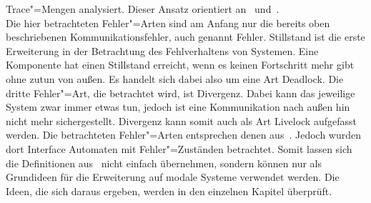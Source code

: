 Trace"=Mengen analysiert. Dieser Ansatz orientiert an~\cite{Vogler2014EIO}
und~\cite{Schinko2016BA}.\\
Die hier betrachteten Fehler"=Arten sind am Anfang nur die bereits oben
beschriebenen Kommunikationsfehler, auch genannt Fehler. Stillstand ist die
erste Erweiterung in der Betrachtung des Fehlverhaltens von Systemen. Eine
Komponente hat einen Stillstand erreicht, wenn es keinen Fortschritt mehr gibt
ohne zutun von außen. Es handelt sich dabei also um eine Art Deadlock. Die
dritte Fehler"=Art, die betrachtet wird, ist Divergenz. Dabei kann das
jeweilige System zwar immer etwas tun, jedoch ist eine Kommunikation nach außen
hin nicht mehr sichergestellt. Divergenz kann somit auch als Art Livelock
aufgefasst werden. Die betrachteten Fehler"=Arten entsprechen denen
aus~\cite{Schinko2016BA}. Jedoch wurden dort Interface Automaten mit
Fehler"=Zuständen betrachtet. Somit lassen sich die Definitionen
aus~\cite{Schinko2016BA} nicht einfach übernehmen, sondern können nur als
Grundideen für die Erweiterung auf modale Systeme verwendet werden. Die Ideen,
die sich daraus ergeben, werden in den einzelnen Kapitel überprüft.
